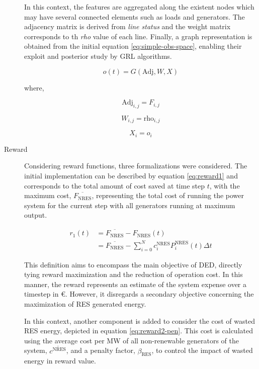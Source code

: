 \begin{description}
	In this context, the features are aggregated along the existent nodes which may have several connected elements such as loads and generators. The adjacency matrix is derived from \textit{line status} and the weight matrix corresponds to th \textit{rho} value of each line. Finally, a graph representation is obtained from the initial equation \ref{eq:simple-obs-space}, enabling their exploit and posterior study by \ac{GRL} algorithms.
	
	\begin{equation}
		o(t) = G(\text{Adj}, W, X)
	\end{equation}
	
	where,
	
	\begin{equation}
		\text{Adj}_{i,j} = F_{i,j}
	\end{equation}
	
	\begin{equation}
		W_{i,j} = \text{rho}_{i,j}
	\end{equation}
	
	\begin{equation}
		X_i = o_i
	\end{equation}
	

	
	\item[Reward] Considering reward functions, three formalizations were considered. The initial implementation can be described by equation \ref{eq:reward1} and corresponds to the total amount of cost saved at time step $t$, with the maximum cost, $\overline{F_\text{NRES}}$, representing the total cost of running the power system for the current step with all generators running at maximum output. \par
	
	
	\begin{equation} \label{eq:reward1}
		\begin{split}
			r_1(t) &= \overline{F_\text{NRES}} - F_\text{NRES}(t) \\
			&= \overline{F_\text{NRES}} - \sum^N_{i=0} c^\text{NRES}_i P^\text{NRES}_i(t) \Delta t
		\end{split}
	\end{equation}
	
	This definition aims to encompass the main objective of \ac{DED}, directly tying reward maximization and the reduction of operation cost. In this manner, the reward represents an estimate of the system expense over a timestep in €. However, it disregards a secondary objective concerning the maximization of \ac{RES} generated energy. \par
	In this context, another component is added to consider the cost of wasted \ac{RES} energy, depicted in equation \ref{eq:reward2-pen}. This cost is calculated using the average cost per MW of all non-renewable generators of the system, $\overline{c^\text{NRES}}$, and a penalty factor, $\beta_\text{RES}$, to control the impact of wasted energy in reward value. \par
	

\end{description}

